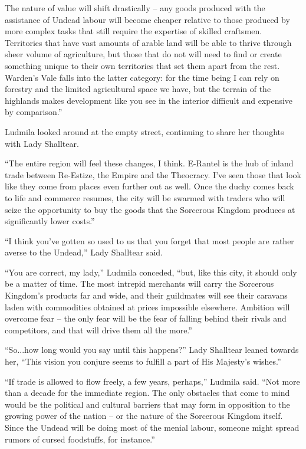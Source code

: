The nature of value will shift drastically – any goods produced with the assistance of Undead labour will become cheaper relative to those produced by more complex tasks that still require the expertise of skilled craftsmen. Territories that have vast amounts of arable land will be able to thrive through sheer volume of agriculture, but those that do not will need to find or create something unique to their own territories that set them apart from the rest. Warden’s Vale falls into the latter category: for the time being I can rely on forestry and the limited agricultural space we have, but the terrain of the highlands makes development like you see in the interior difficult and expensive by comparison.”

 

Ludmila looked around at the empty street, continuing to share her thoughts with Lady Shalltear.

 

“The entire region will feel these changes, I think. E-Rantel is the hub of inland trade between Re-Estize, the Empire and the Theocracy. I’ve seen those that look like they come from places even further out as well. Once the duchy comes back to life and commerce resumes, the city will be swarmed with traders who will seize the opportunity to buy the goods that the Sorcerous Kingdom produces at significantly lower costs.”

 

“I think you’ve gotten so used to us that you forget that most people are rather averse to the Undead,” Lady Shalltear said.

 

“You are correct, my lady,” Ludmila conceded, “but, like this city, it should only be a matter of time. The most intrepid merchants will carry the Sorcerous Kingdom’s products far and wide, and their guildmates will see their caravans laden with commodities obtained at prices impossible elsewhere. Ambition will overcome fear – the only fear will be the fear of falling behind their rivals and competitors, and that will drive them all the more.”

 

“So...how long would you say until this happens?” Lady Shalltear leaned towards her, “This vision you conjure seems to fulfill a part of His Majesty’s wishes.”

 

“If trade is allowed to flow freely, a few years, perhaps,” Ludmila said. “Not more than a decade for the immediate region. The only obstacles that come to mind would be the political and cultural barriers that may form in opposition to the growing power of the nation – or the nature of the Sorcerous Kingdom itself. Since the Undead will be doing most of the menial labour, someone might spread rumors of cursed foodstuffs, for instance.”

